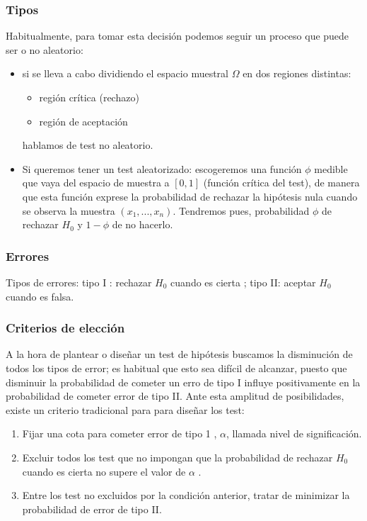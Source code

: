\documentclass[a4paper,12pt]{article}
\begin{document}
\subsubsection{Tipos}
Habitualmente, para tomar esta decisión podemos seguir un proceso que puede ser o no aleatorio: 
\begin{itemize}
	\item si se lleva a cabo dividiendo el espacio muestral $\Omega$ en dos regiones distintas:
	\begin{itemize}
		\item región crítica (rechazo)
		\item región de aceptación 
	\end{itemize} 
	hablamos de test no aleatorio.
	\item Si queremos tener un test aleatorizado: escogeremos una función $\phi$ medible que vaya del espacio de muestra a $[0,1]$ (función crítica del test), de manera que esta función exprese la probabilidad de rechazar la hipótesis nula cuando se observa la muestra $(x_1,...,x_n)$.
	Tendremos pues, probabilidad $\phi$ de rechazar $H_0$ y $1-\phi$ de no hacerlo. 
\end{itemize}

\subsubsection{Errores}

Tipos de errores: tipo I : rechazar $H_0$ cuando es cierta ; tipo II: aceptar $H_0$ cuando es falsa.

\subsubsection{Criterios de elección}
A la hora de plantear o diseñar un test de hipótesis buscamos la disminución de todos los tipos de error; es habitual que esto sea difícil de alcanzar, puesto que disminuir la probabilidad de cometer un erro de tipo I influye positivamente en la probabilidad de cometer error de tipo II. Ante esta amplitud de posibilidades, existe un criterio tradicional para para diseñar los test:
\begin{enumerate}
	\item Fijar una cota para cometer error de tipo 1 , $\alpha$, llamada nivel de significación.
	\item Excluir todos los test que no impongan que la probabilidad de rechazar $H_0$ cuando es cierta no supere el valor de $\alpha$ . 
	\item  Entre los test no excluidos por la condición anterior, tratar de minimizar la probabilidad de error de tipo II.
\end{enumerate}
\end{document}
